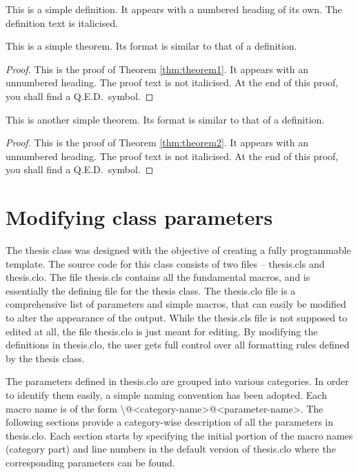 \documentclass[twoside,openany]{thesis}
\begin{document}
\begin{definition}
This is a simple definition.
It appears with a numbered heading of its own.
The definition text is italicised.
\end{definition}

\begin{theorem}\label{thm:theorem1}
This is a simple theorem.
Its format is similar to that of a definition.
\end{theorem}

\begin{proof}
This is the proof of Theorem \ref{thm:theorem1}.
It appears with an unnumbered heading.
The proof text is not italicised.
At the end of this proof, you shall find a Q.E.D.\ symbol.
\end{proof}

\begin{theorem}\label{thm:theorem2}
This is another simple theorem.
Its format is similar to that of a definition.
\end{theorem}

\begin{proof}
This is the proof of Theorem \ref{thm:theorem2}.
It appears with an unnumbered heading.
The proof text is not italicised.
At the end of this proof, you shall find a Q.E.D.\ symbol.
\end{proof}

\chapter{Modifying class parameters}\label{ch:Modifying class parameters}

The {\ttfamily thesis} class was designed with the objective of creating a fully programmable template.
The source code for this class consists of two files -- {\ttfamily thesis.cls} and {\ttfamily thesis.clo}.
The file {\ttfamily thesis.cls} contains all the fundamental macros, and is essentially the defining file for the {\ttfamily thesis} class.
The {\ttfamily thesis.clo} file is a comprehensive list of parameters and simple macros, that can easily be modified to alter the appearance of the output.
While the {\ttfamily thesis.cls} file is not supposed to edited at all, the file {\ttfamily thesis.clo} is just meant for editing.
By modifying the definitions in {\ttfamily thesis.clo}, the user gets full control over all formatting rules defined by the {\ttfamily thesis} class.

The parameters defined in {\ttfamily thesis.clo} are grouped into various categories.
In order to identify them easily, a simple naming convention has been adopted.
Each macro name is of the form {\ttfamily\textbackslash @<category-name>@<parameter-name>}.
The following sections provide a category-wise description of all the parameters in {\ttfamily thesis.clo}.
Each section starts by specifying the initial portion of the macro names (category part) and line numbers in the default version of {\ttfamily thesis.clo} where the corresponding parameters can be found.
\end{document}
